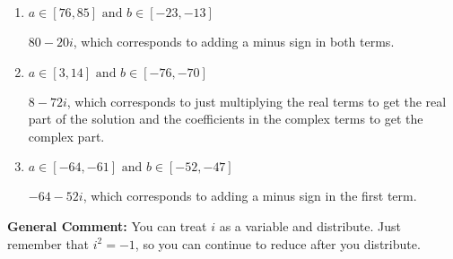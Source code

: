 \documentclass{extbook}[14pt]
\begin{document}
\begin{enumerate}
{\begin{enumerate}[label=\Alph*.]
 $-64 + 52 i$, which corresponds to adding a minus sign in the second term.
\item \( a \in [76, 85] \text{ and } b \in [-23, -13] \)

 $80 - 20 i$, which corresponds to adding a minus sign in both terms.
\item \( a \in [3, 14] \text{ and } b \in [-76, -70] \)

 $8 - 72 i$, which corresponds to just multiplying the real terms to get the real part of the solution and the coefficients in the complex terms to get the complex part.
\item \( a \in [-64, -61] \text{ and } b \in [-52, -47] \)

 $-64 - 52 i$, which corresponds to adding a minus sign in the first term.
\end{enumerate}

\textbf{General Comment:} You can treat $i$ as a variable and distribute. Just remember that $i^2=-1$, so you can continue to reduce after you distribute.
}
\end{enumerate}
\end{document}
